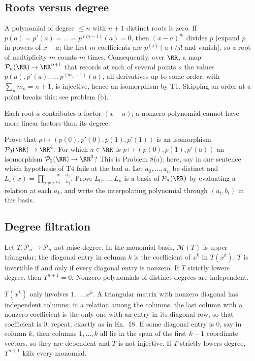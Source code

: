 \documentclass[11pt]{scrartcl}
\newcommand{\PP}{\mathcal P}
\newcommand{\MM}{\mathcal M}
\begin{document}
\subsection{Roots versus degree}
\begin{theorem*}[T4]
  A polynomial of degree $\le n$ with $n+1$ distinct roots is zero.
  If $p(a)=p'(a)=\dots=p^{(m-1)}(a)=0$, then $(x-a)^m$ divides $p$ (expand $p$ in powers of $x-a$; the first $m$ coefficients are $p^{(j)}(a)/j!$ and vanish), so a root of multiplicity $m$ counts $m$ times.
  Consequently, over $\RR$, a map $\PP_n(\RR)\to\RR^{n+1}$ that records at each of several points $a$ the values $p(a),p'(a),\dots,p^{(m_a-1)}(a)$, all derivatives up to some order, with $\sum_a m_a=n+1$, is injective, hence an isomorphism by T1. Skipping an order at a point breaks this: see problem (b).
\end{theorem*}
\why Each root $a$ contributes a factor $(x-a)$; a nonzero polynomial cannot have more linear factors than its degree.
\probs
\begin{enumerate}[(a)]
  \ii Prove that $p\mapsto(p(0),p'(0),p(1),p'(1))$ is an isomorphism $\PP_3(\RR)\to\RR^4$.
  \ii For which $a\in\RR$ is $p\mapsto(p(0),p(1),p'(a))$ an isomorphism $\PP_2(\RR)\to\RR^3$? This is Problem 8(a); here, say in one sentence which hypothesis of T4 fails at the bad $a$.
  \ii Let $a_0,\dots,a_n$ be distinct and $L_i(x)=\prod_{j\ne i}\frac{x-a_j}{a_i-a_j}$. Prove $L_0,\dots,L_n$ is a basis of $\PP_n(\RR)$ by evaluating a relation at each $a_k$, and write the interpolating polynomial through $(a_i,b_i)$ in this basis.
\end{enumerate}

\subsection{Degree filtration}
\begin{theorem*}[T5]
  Let $T\colon\PP_n\to\PP_n$ not raise degree. In the monomial basis, $\MM(T)$ is upper triangular; the diagonal entry in column $k$ is the coefficient of $x^k$ in $T(x^k)$.
  $T$ is invertible if and only if every diagonal entry is nonzero.
  If $T$ strictly lowers degree, then $T^{n+1}=0$.
  Nonzero polynomials of distinct degrees are independent.
\end{theorem*}
\why $T(x^k)$ only involves $1,\dots,x^k$. A triangular matrix with nonzero diagonal has independent columns: in a relation among the columns, the last column with a nonzero coefficient is the only one with an entry in its diagonal row, so that coefficient is $0$; repeat, exactly as in Ex.~18. If some diagonal entry is $0$, say in column $k$, then columns $1,\dots,k$ all lie in the span of the first $k-1$ coordinate vectors, so they are dependent and $T$ is not injective. If $T$ strictly lowers degree, $T^{n+1}$ kills every monomial.
\end{document}
